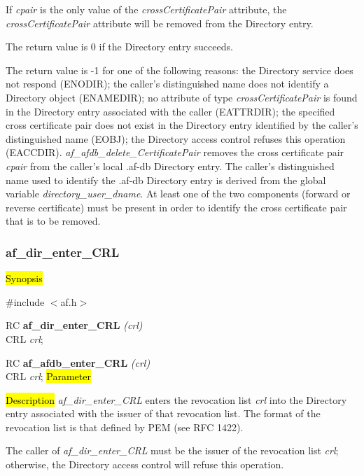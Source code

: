 If {\em cpair} is the only value of the {\em crossCertificatePair} attribute, the 
{\em crossCertificatePair} attribute will be removed from the Directory entry.

The return value is 0 if the Directory entry succeeds.

The return value is -1 for one of the following reasons:
\bi
\m the Directory service does not respond (ENODIR);
\m the caller's distinguished name does not identify a Directory object (ENAMEDIR);
\m no attribute of type {\em crossCertificatePair} is found in the Directory entry 
associated with the caller (EATTRDIR);
\m the specified cross certificate pair does not exist in the Directory entry 
identified by the caller's distinguished name (EOBJ);
\m the Directory access control refuses this operation (EACCDIR).
\ei
{\em af\_afdb\_delete\_CertificatePair} removes the cross certificate pair {\em cpair} 
from the caller's local .af-db Directory entry. The caller's distinguished name used to
identify the .af-db Directory entry is derived from
the global variable {\em directory\_user\_dname}. At least one of the two components 
(forward or reverse certificate) must be present in order to identify the cross certificate
pair that is to be removed.



\subsubsection{af\_dir\_enter\_CRL}

\hl{Synopsis}

\#include $<$af.h$>$

RC {\bf af\_dir\_enter\_CRL} {\em (crl)} \\
CRL {\em *crl};

RC {\bf af\_afdb\_enter\_CRL} {\em (crl)} \\
CRL {\em *crl};
\hl{Parameter}

\hl{Description}
{\em af\_dir\_enter\_CRL} enters the revocation list {\em crl} into 
the Directory entry associated with the issuer of that revocation list.
The format of the revocation list is that defined by PEM (see RFC 1422).

The caller of {\em af\_dir\_enter\_CRL} must be the issuer of the revocation list
{\em crl}; otherwise, the Directory access control will 
refuse this operation.

